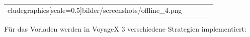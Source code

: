 \begin{table}[H]
\begin{adjustwidth}{-0.3cm}{0.3cm}
\begin{tabulary}{\columnwidth}{C >{\centering}m{1cm} C >{\centering}m{1cm} C}
cludegraphics[scale=0.5]{bilder/screenshots/offline_4.png} \\
		\end{tabulary}
  		\end{adjustwidth}
	\end{table}
Für das Vorladen werden in VoyageX 3 verschiedene Strategien implementiert:
